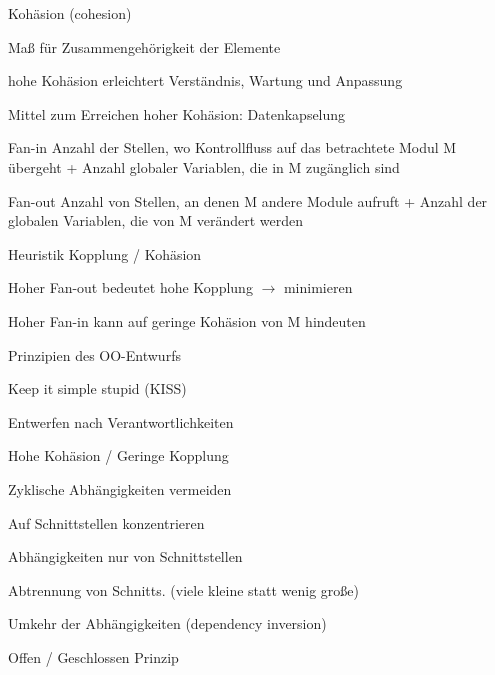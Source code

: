 \documentclass[a4paper]{article}
\begin{document}
\begin{multicols}{3}
  Kohäsion (cohesion)
  \begin{itemize*}
    \item Maß für Zusammengehörigkeit der Elemente
    \item hohe Kohäsion erleichtert Verständnis, Wartung und Anpassung
    \item Mittel zum Erreichen hoher Kohäsion: Datenkapselung
  \end{itemize*}
  \begin{description*}
    \item[Fan-in] Anzahl der Stellen, wo Kontrollfluss auf das betrachtete Modul M übergeht + Anzahl globaler Variablen, die in M zugänglich sind
    \item[Fan-out] Anzahl von Stellen, an denen M andere Module aufruft + Anzahl der globalen Variablen, die von M verändert werden
  \end{description*}
  \begin{itemize*}
    \item Heuristik Kopplung / Kohäsion
    \begin{itemize*}
      \item Hoher Fan-out bedeutet hohe Kopplung $\rightarrow$ minimieren
      \item Hoher Fan-in kann auf geringe Kohäsion von M hindeuten
    \end{itemize*}
  \end{itemize*}

  Prinzipien des OO-Entwurfs
  \begin{itemize*}
    \item Keep it simple stupid (KISS)
    \item Entwerfen nach Verantwortlichkeiten
    \item Hohe Kohäsion / Geringe Kopplung
    \item Zyklische Abhängigkeiten vermeiden
    \item Auf Schnittstellen konzentrieren
    \begin{itemize*}
      \item Abhängigkeiten nur von Schnittstellen
      \item Abtrennung von Schnitts. (viele kleine statt wenig große)
      \item Umkehr der Abhängigkeiten (dependency inversion)
    \end{itemize*}
    \item Offen / Geschlossen Prinzip
  \end{itemize*}


\end{multicols}
\end{document}
